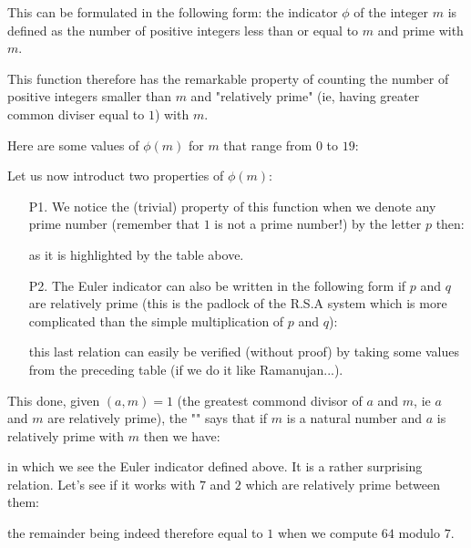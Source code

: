 	This can be formulated in the following form: the indicator $\phi$ of the integer $m$ is defined as the number of positive integers less than or equal to $m$ and prime with $m$.

	This function therefore has the remarkable property of counting the number of positive integers smaller than $m$ and "relatively prime" (ie, having greater common diviser equal to $1$) with $m$.

	Here are some values of $\phi(m)$ for $m$ that range from $0$ to $19$:
	
	Let us now introduct two properties of $\phi(m)$:
	\begin{enumerate}
		\item[P1.] We notice the (trivial) property of this function when we denote any prime number (remember that $1$ is not a prime number!) by the letter $p$ then:
		
		as it is highlighted by the table above.
	
		\item[P2.] The Euler indicator can also be written in the following form if $p$ and $q$ are relatively prime (this is the padlock of the R.S.A system which is more complicated than the simple multiplication of $p$ and $q$):
		
		this last relation can easily be verified (without proof) by taking some values from the preceding table (if we do it like Ramanujan...).
	\end{enumerate}
	\begin{theorem}
	This done, given $(a,m)=1$ (the greatest commond divisor of $a$ and $m$, ie $a$ and $m$ are relatively prime), the "" says that if $m$ is a natural number and $a$ is relatively prime with $m$ then we have:
	
	in which we see the Euler indicator defined above. It is a rather surprising relation. Let's see if it works with $7$ and $2$ which are relatively prime between them:
	
	the remainder being indeed therefore equal to $1$ when we compute $64$ modulo $7$.
	\end{theorem}
